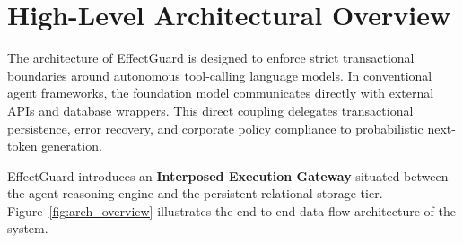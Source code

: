 
\section{High-Level Architectural Overview}

The architecture of EffectGuard is designed to enforce strict transactional boundaries around autonomous tool-calling language models. In conventional agent frameworks, the foundation model communicates directly with external APIs and database wrappers. This direct coupling delegates transactional persistence, error recovery, and corporate policy compliance to probabilistic next-token generation. 

EffectGuard introduces an \textbf{Interposed Execution Gateway} situated between the agent reasoning engine and the persistent relational storage tier. Figure~\ref{fig:arch_overview} illustrates the end-to-end data-flow architecture of the system.

